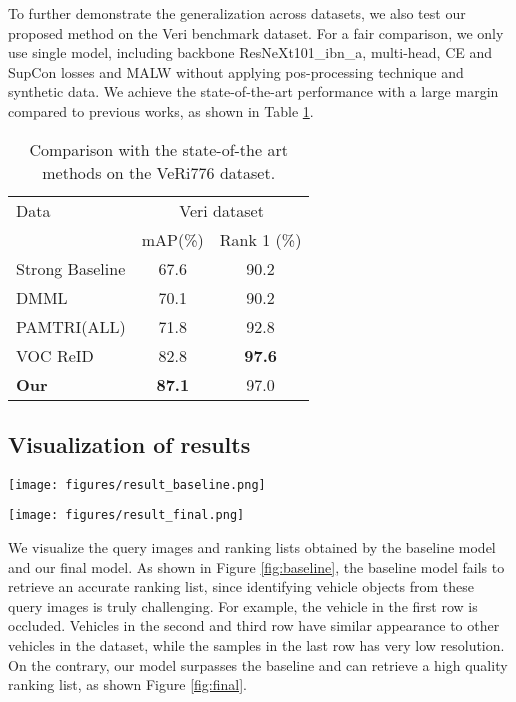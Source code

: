 \documentclass[10pt,twocolumn,letterpaper]{article}
\begin{document}
To further demonstrate the generalization across datasets, we also test our proposed method on the Veri benchmark dataset. For a fair comparison, we only use single model, including backbone ResNeXt101\_ibn\_a, multi-head, CE and SupCon losses and MALW without applying pos-processing technique and synthetic data. We achieve the state-of-the-art performance with a large margin compared to previous works, as shown in Table \ref{tab:veri}.
\begin{table}
	\centering
	\begin{tabular}{l|cc}
		\hline
		Data & \multicolumn{2}{c}{Veri dataset} \\ & 
		mAP(\%) & Rank 1 (\%) \\
		\hline\hline
		Strong Baseline \cite{strongbaseline} & 67.6  & 90.2 \\
		DMML \cite{dmml}  & 70.1  & 90.2   \\
		PAMTRI(ALL) \cite{all} & 71.8  & 92.8  \\
		VOC ReID \cite{2nd} &82.8  & \textbf{97.6} \\
	
		\textbf{Our} &\textbf{ 87.1}  & 97.0 \\
		\hline
	\end{tabular}
	\caption{Comparison with the state-of-the art methods on the VeRi776 dataset.}
	\label{tab:veri}
\end{table}

\subsection{Visualization of results}
\begin{figure*}
	\centering
  \texttt{[image: figures/result\_baseline.png]}
  \caption{Result on the baseline model. Each row presents the query images and retrieved top 6 gallery images. Green and red boxes denote true positive and false positive sample, respectively.}
  \label{fig:baseline}
\end{figure*}
\begin{figure*}
	\centering
  \texttt{[image: figures/result\_final.png]}
  \caption{Result on the final model. Each row presents the query images and retrieved top 6 gallery images. Green and red boxes denote true positive and false positive sample, respectively.}
  \label{fig:final}
\end{figure*}

We visualize the query images and ranking lists obtained by the baseline model and our final model. As shown in Figure \ref{fig:baseline}, the baseline model fails to retrieve an accurate ranking list, since identifying vehicle objects from these query images is truly challenging. For example, the vehicle in the first row is occluded. Vehicles in the second and third row have similar appearance to other vehicles in the dataset, while the samples in the last row has very low resolution. On the contrary, our model surpasses the baseline and can retrieve a high quality ranking list, as shown Figure \ref{fig:final}.
\end{document}
